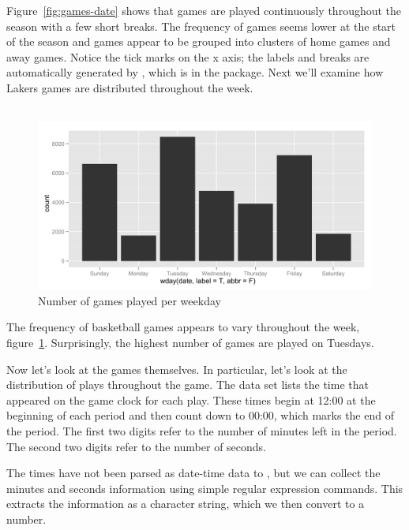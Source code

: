 \documentclass[article]{jss}
\begin{document}
Figure~\ref{fig:games-date} shows that games are played continuously throughout the season with a few short breaks. The frequency of games seems lower at the start of the season and games appear to be grouped into clusters of home games and away games. Notice the tick marks on the x axis; the labels and breaks are automatically generated by , which is in the  package. Next we'll examine how Lakers games are distributed throughout the week.\\

\\

\begin{figure}[htpb]
  \centering    
    \includegraphics[width=\textwidth]{weekdays-histogram.png}     
  \caption{Number of games played per weekday}
  \label{fig:games-days}
\end{figure}


The frequency of basketball games appears to vary throughout the week, figure~\ref{fig:games-days}. Surprisingly, the highest number of games are played on Tuesdays.

Now let's look at the games themselves. In particular, let's look at the distribution of plays throughout the game. The  data set lists the time that appeared on the game clock for each play. These times begin at 12:00 at the beginning of each period and then count down to 00:00, which marks the end of the period. The first two digits refer to the number of minutes left in the period. The second two digits refer to the number of seconds.

The times have not been parsed as date-time data to , but we can collect the minutes and seconds information using simple regular expression commands. This extracts the information as a character string, which we then convert to a number.\\
\end{document}
